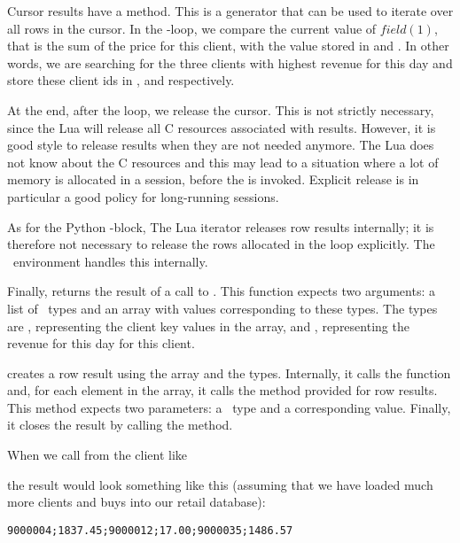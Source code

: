 Cursor results have a  method.
This is a generator that can be used to
iterate over all rows in the cursor.
In the -loop, we compare the current
value of $field(1)$, that is the sum of the price
for this client, with the value stored in
 and . In other words,
we are searching for the three clients with
highest revenue for this day and store these
client ids in ,  and
 respectively.

At the end, after the loop, we release the cursor.
This is not strictly necessary, since the Lua 
will release all C resources associated with results.
However, it is good style to release results when they
are not needed anymore. The Lua  does not
know about the C resources and this may lead to a situation
where a lot of memory is allocated in a session,
before the  is invoked.
Explicit release is in particular
a good policy for long-running sessions.

As for the Python -block,
The Lua iterator releases row results internally;
it is therefore not necessary to release
the rows allocated in the loop explicitly.
The \nowdb\ environment handles this internally.

Finally,  returns the result
of a call to .
This function expects two arguments:
a list of \nowdb\ types and an array with
values corresponding to these types.
The types are , representing the
client key values in the  array,
and , representing the revenue
for this day for this client.

 creates a row result
using the array and the types. Internally,
it calls the  function
and, for each element in the array, it calls
the method  provided for row results.
This method expects two parameters:
a \nowdb\ type and a corresponding value.
Finally, it closes the result by calling
the  method.

When we call  from the client like


the result would look something like this
(assuming that we have loaded much more
clients and buys into our retail database):
\begin{verbatim}
9000004;1837.45;9000012;17.00;9000035;1486.57
\end{verbatim}

